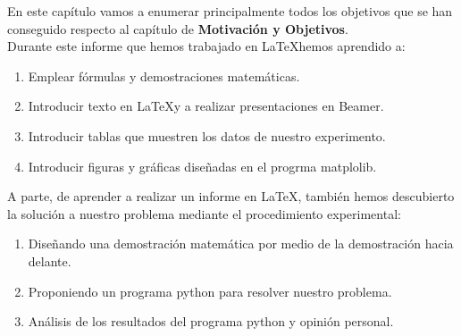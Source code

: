 En este capítulo vamos a enumerar principalmente todos los objetivos que se han conseguido respecto al capítulo de {\bf Motivación y Objetivos}.\\
Durante este informe que hemos trabajado en \LaTeX hemos aprendido a:
\begin{enumerate}
\item Emplear fórmulas y demostraciones matemáticas.
\item Introducir texto en \LaTeX y a realizar presentaciones en Beamer.
\item Introducir tablas que muestren los datos de nuestro experimento.
\item Introducir figuras y gráficas diseñadas en el progrma matplolib.
\end{enumerate}

A parte, de aprender a realizar un informe en \LaTeX, también hemos descubierto la solución a nuestro problema mediante el procedimiento experimental:
\begin{enumerate}
\item Diseñando una demostración matemática por medio de la demostración hacia delante.
\item Proponiendo un programa python para resolver nuestro problema.
\item Análisis de los resultados del programa python y opinión personal.
\end{enumerate} 
